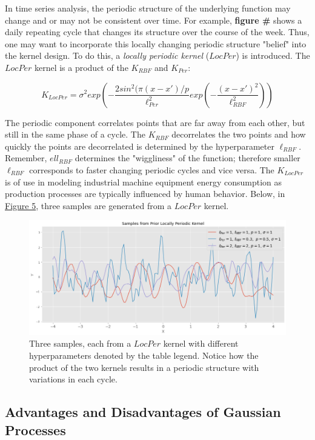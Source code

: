 In time series analysis, the periodic structure of the underlying function may change and or may not be consistent over time. For example, \textbf{figure #} shows a daily repeating cycle that changes its structure over the course of the week. Thus, one may want to incorporate this locally changing periodic structure "belief" into the kernel design. To do this, a \textit{locally periodic kernel} ($LocPer$) is introduced. The $LocPer$ kernel is a product of the $K_{RBF}$ and $K_{Per}$:

\begin{equation}
    K_{LocPer} = \sigma^2 exp (-\frac{2sin^2(\pi(x - x') / p}{\ell_{Per}^2}exp(-\frac{(x - x')^2}{\ell_{RBF}^2}))
\end{equation}

The periodic component correlates points that are far away from each other, but still in the same phase of a cycle. The $K_{RBF}$ decorrelates the two points and how quickly the points are decorrelated is determined by the hyperparameter $\ell_{RBF}$. Remember, $ell_{RBF}$ determines the "wiggliness" of the function; therefore smaller $\ell_{RBF}$ corresponds to faster changing periodic cycles and vice versa. The $K_{LocPer}$ is of use in modeling industrial machine equipment energy consumption as production processes are typically influenced by human behavior. Below, in \hyperlink{figure.5}{Figure 5}, three samples are generated from a $LocPer$ kernel.

\begin{figure}[htp]
\centering
\graphicspath{ {./images/} }
\includegraphics[scale=0.49]{images/samples_locper_prior.png}
\caption{Three samples, each from a $LocPer$ kernel with different hyperparameters denoted by the table legend. Notice how the product of the two kernels results in a periodic structure with variations in each cycle.}
\end{figure}


\subsection{Advantages and Disadvantages of Gaussian Processes}


